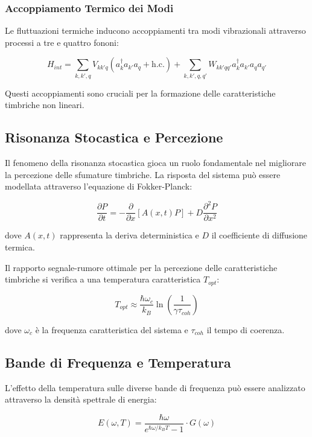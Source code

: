 \documentclass{gs-adonis}
\begin{document}
\subsubsection{Accoppiamento Termico dei
Modi}\label{accoppiamento-termico-dei-modi}

Le fluttuazioni termiche inducono accoppiamenti tra modi vibrazionali
attraverso processi a tre e quattro fononi:

\[H_{int} = \sum_{k,k',q} V_{kk'q}(a_k^\dagger a_{k'} a_q + \text{h.c.}) +
    \sum_{k,k',q,q'} W_{kk'qq'}a_k^\dagger a_{k'} a_q a_{q'}\]

Questi accoppiamenti sono cruciali per la formazione delle
caratteristiche timbriche non lineari.

\subsection{Risonanza Stocastica e
Percezione}\label{risonanza-stocastica-e-percezione}

Il fenomeno della risonanza stocastica gioca un ruolo fondamentale nel
migliorare la percezione delle sfumature timbriche. La risposta del
sistema può essere modellata attraverso l'equazione di Fokker-Planck:

\[\frac{\partial P}{\partial t} = -\frac{\partial}{\partial x}[A(x,t)P] + D\frac{\partial^2 P}{\partial x^2}\]

dove \(A(x,t)\) rappresenta la deriva deterministica e \(D\) il
coefficiente di diffusione termica.

Il rapporto segnale-rumore ottimale per la percezione delle
caratteristiche timbriche si verifica a una temperatura caratteristica
\(T_{opt}\):

\[T_{opt} \approx \frac{\hbar\omega_c}{k_B}\ln\left(\frac{1}{\gamma\tau_{coh}}\right)\]

dove \(\omega_c\) è la frequenza caratteristica del sistema e
\(\tau_{coh}\) il tempo di coerenza.

\subsection{Bande di Frequenza e
Temperatura}\label{bande-di-frequenza-e-temperatura}

L'effetto della temperatura sulle diverse bande di frequenza può essere
analizzato attraverso la densità spettrale di energia:

\[E(\omega, T) = \frac{\hbar\omega}{e^{\hbar\omega/k_BT} - 1} \cdot G(\omega)\]
\end{document}
